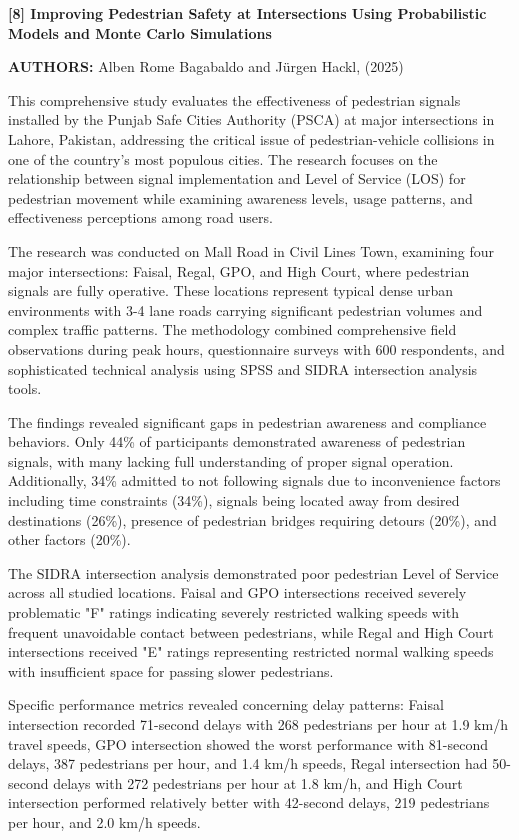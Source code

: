 \documentclass[a4paper, 12pt]{report}
\begin{document}
\noindent \textbf{[8] Improving Pedestrian Safety at Intersections Using Probabilistic Models and Monte Carlo Simulations}

\textbf{AUTHORS:} Alben Rome Bagabaldo and Jürgen Hackl, (2025)



This comprehensive study evaluates the effectiveness of pedestrian signals installed by the Punjab Safe Cities Authority (PSCA) at major intersections in Lahore, Pakistan, addressing the critical issue of pedestrian-vehicle collisions in one of the country's most populous cities. The research focuses on the relationship between signal implementation and Level of Service (LOS) for pedestrian movement while examining awareness levels, usage patterns, and effectiveness perceptions among road users.

The research was conducted on Mall Road in Civil Lines Town, examining four major intersections: Faisal, Regal, GPO, and High Court, where pedestrian signals are fully operative. These locations represent typical dense urban environments with 3-4 lane roads carrying significant pedestrian volumes and complex traffic patterns. The methodology combined comprehensive field observations during peak hours, questionnaire surveys with 600 respondents, and sophisticated technical analysis using SPSS and SIDRA intersection analysis tools.

The findings revealed significant gaps in pedestrian awareness and compliance behaviors. Only 44\% of participants demonstrated awareness of pedestrian signals, with many lacking full understanding of proper signal operation. Additionally, 34\% admitted to not following signals due to inconvenience factors including time constraints (34\%), signals being located away from desired destinations (26\%), presence of pedestrian bridges requiring detours (20\%), and other factors (20\%).

The SIDRA intersection analysis demonstrated poor pedestrian Level of Service across all studied locations. Faisal and GPO intersections received severely problematic "F" ratings indicating severely restricted walking speeds with frequent unavoidable contact between pedestrians, while Regal and High Court intersections received "E" ratings representing restricted normal walking speeds with insufficient space for passing slower pedestrians.

Specific performance metrics revealed concerning delay patterns: Faisal intersection recorded 71-second delays with 268 pedestrians per hour at 1.9 km/h travel speeds, GPO intersection showed the worst performance with 81-second delays, 387 pedestrians per hour, and 1.4 km/h speeds, Regal intersection had 50-second delays with 272 pedestrians per hour at 1.8 km/h, and High Court intersection performed relatively better with 42-second delays, 219 pedestrians per hour, and 2.0 km/h speeds.
\end{document}
